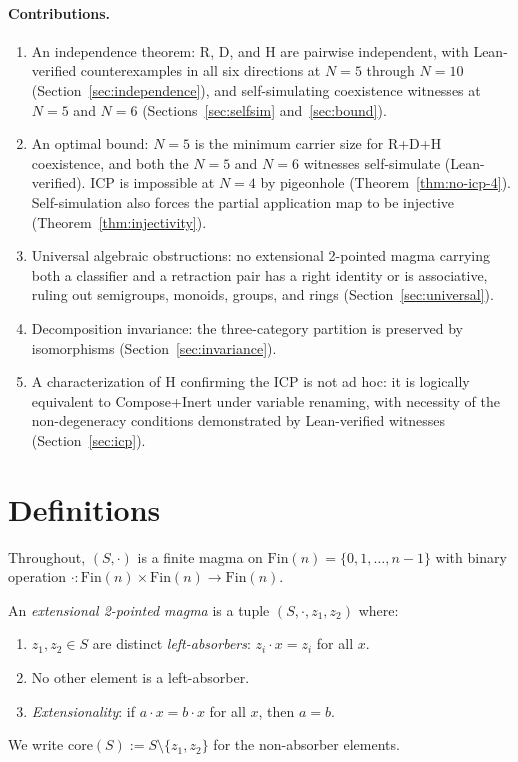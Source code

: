 \documentclass[sigconf,screen]{acmart}
\newcommand{\dotop}{\cdot}
\newcommand{\Fin}{\mathrm{Fin}}
\newcommand{\core}{\mathrm{core}}
\theoremstyle{remark}
\begin{document}
\paragraph{Contributions.}
\begin{enumerate}
  \item An independence theorem: R, D, and H are pairwise independent, with Lean-verified counterexamples in all six directions at $N\!=\!5$ through $N\!=\!10$ (Section~\ref{sec:independence}), and self-simulating coexistence witnesses at $N\!=\!5$ and $N\!=\!6$ (Sections~\ref{sec:selfsim} and~\ref{sec:bound}).
  \item An optimal bound: $N\!=\!5$ is the minimum carrier size for R+D+H coexistence, and both the $N\!=\!5$ and $N\!=\!6$ witnesses self-simulate (Lean-verified). ICP is impossible at $N\!=\!4$ by pigeonhole (Theorem~\ref{thm:no-icp-4}). Self-simulation also forces the partial application map to be injective (Theorem~\ref{thm:injectivity}).
  \item Universal algebraic obstructions: no extensional 2-pointed magma carrying both a classifier and a retraction pair has a right identity or is associative, ruling out semigroups, monoids, groups, and rings (Section~\ref{sec:universal}).
  \item Decomposition invariance: the three-category partition is preserved by isomorphisms (Section~\ref{sec:invariance}).
  \item A characterization of H confirming the ICP is not ad hoc: it is logically equivalent to Compose+Inert under variable renaming, with necessity of the non-degeneracy conditions demonstrated by Lean-verified witnesses (Section~\ref{sec:icp}).
\end{enumerate}

\section{Definitions}
\label{sec:definitions}

Throughout, $(S, \dotop)$ is a finite magma on $\Fin(n) = \{0, 1, \ldots, n-1\}$ with binary operation $\dotop : \Fin(n) \times \Fin(n) \to \Fin(n)$.

\begin{definition}
\label{def:epm}
An \emph{extensional 2-pointed magma} is a tuple $(S, \dotop, z_1, z_2)$ where:
\begin{enumerate}
  \item $z_1, z_2 \in S$ are distinct \emph{left-absorbers}: $z_i \dotop x = z_i$ for all $x$.
  \item No other element is a left-absorber.
  \item \emph{Extensionality}: if $a \dotop x = b \dotop x$ for all $x$, then $a = b$.
\end{enumerate}
We write $\core(S) := S \setminus \{z_1, z_2\}$ for the non-absorber elements.
\end{definition}
\end{document}
